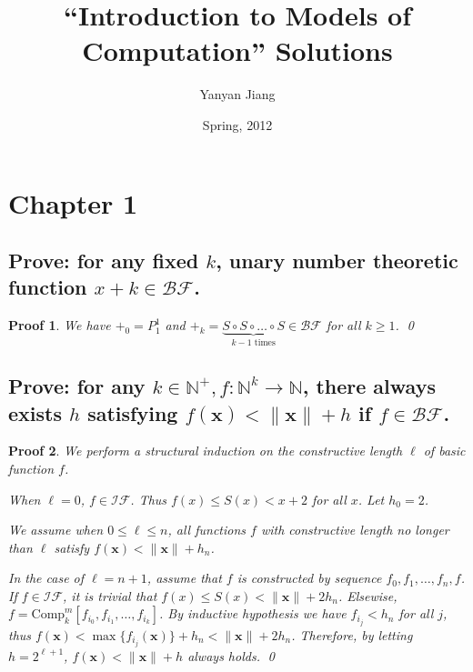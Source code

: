 \documentclass[11pt]{article}
\newcommand{\kai}{\CJKfamily{kai}}
\newcommand{\hei}{\CJKfamily{hei}}
\begin{document}
\newtheorem{thm}{定理}
\newtheorem{deff}[thm]{定义}
\newtheorem*{pf}{Proof}
\newtheorem{lem}[thm]{引理}

\title{\hei \bf ``Introduction to Models of Computation'' Solutions}
\author {Yanyan Jiang}
\date{\kai Spring, 2012}

\maketitle

\section{Chapter 1}

\subsection{Prove: for any fixed $k$, unary number theoretic function $x+k\in\mathcal{BF}$.}
\begin{pf} \rm We have $+_0 = P_1^1$ and
$+_k=\underbrace{S\circ S\circ \ldots \circ S}_{\textrm{$k-1$ times}}\in\mathcal{BF}$
for all $k\geq 1$. \qed
\end{pf}

\subsection{Prove: for any $k\in\mathbb{N}^+, f:\mathbb{N}^k\to\mathbb{N}$,
there always exists $h$ satisfying $f(\mathbf{x})<\|\mathbf{x}\|+h$ if $f\in\mathcal{BF}$.}
\begin{pf} \rm
We perform a structural induction on the constructive length $\ell$ of basic function $f$.

When $\ell=0$, $f\in\mathcal{IF}$. Thus $f(x) \leq S(x) < x + 2$ for all $x$.
Let $h_0 = 2$.

We assume when $0\leq \ell \leq n$, all functions $f$ with constructive length
no longer than $\ell$ satisfy $f(\mathbf{x})<\|\mathbf{x}\|+h_n$.

In the case of $\ell = n + 1$, assume that $f$ is constructed by sequence $f_0,f_1,\ldots,f_n,f$.
If $f\in\mathcal{IF}$, it is trivial that $f(x) \leq S(x) < \|\mathbf{x}\|+2h_{n}$.
Elsewise, $f = \textrm{Comp}^m_k[f_{i_0},f_{i_1},\ldots,f_{i_k}]$.
By inductive hypothesis we have $f_{i_j} < h_n$ for all $j$, thus
$f(\mathbf{x}) < \max\{f_{i_j}(\mathbf{x})\} + h_n < \|\mathbf{x}\| + 2h_n$.
Therefore, by letting $h=2^{\ell + 1}$,  $f(\mathbf{x})<\|\mathbf{x}\|+h$ always
holds. \qed

\end{pf}
\end{document}
